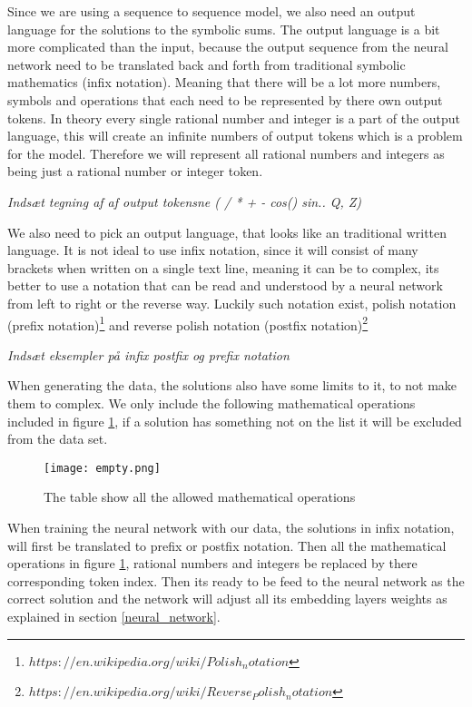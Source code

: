 Since we are using a sequence to sequence model, we also need an output language for the solutions to the symbolic sums. The output language is a bit more complicated than the input, because the output sequence from the neural network need to be translated back and forth from traditional symbolic mathematics (infix notation). Meaning that there will be a lot more numbers, symbols and operations that each need to be represented by there own output tokens. In theory every single rational number and integer is a part of the output language, this will create an infinite numbers of output tokens which is a problem for the model. Therefore we will represent all rational numbers and integers as being just a rational number or integer token.

\emph{Indsæt tegning af af output tokensne ( / * + - cos() sin.. Q, Z)}

We also need to pick an output language, that looks like an traditional written language. It is not ideal to use infix notation, since it will consist of many brackets when written on a single text line, meaning it can be to complex, its better to use a notation that can be read and understood by a neural network from left to right or the reverse way. Luckily such notation exist, polish notation (prefix notation)\footnote{$https://en.wikipedia.org/wiki/Polish_notation$} and reverse polish notation (postfix notation)\footnote{$https://en.wikipedia.org/wiki/Reverse_Polish_notation$} 


\emph{Indsæt eksempler på infix postfix og prefix notation}

When generating the data, the solutions also have some limits to it, to not make them to complex. We only include the following  mathematical operations included in figure \ref{tabel_over_included_operations}, if a solution has something not on the list it will be excluded from the data set.

\begin{figure}[H]    
    \centering
    \texttt{[image: empty.png]}
    \label{tabel_over_included_operations}
    \caption{The table show all the allowed mathematical operations}
\end{figure}

When training the neural network with our data, the solutions in infix notation, will first be translated to prefix or postfix notation. Then all the mathematical operations in figure \ref{tabel_over_included_operations}, rational numbers and integers be replaced by there corresponding token index. Then its ready to be feed to the neural network as the correct solution and the network will adjust all its embedding layers weights as explained in section \ref{neural_network}. 



